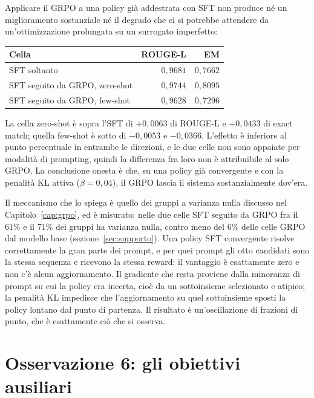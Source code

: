 Applicare il GRPO a una policy già addestrata con SFT non produce né un
miglioramento sostanziale né il degrado che ci si potrebbe attendere da
un'ottimizzazione prolungata su un surrogato imperfetto:

\begin{center}
\begin{tabular}{lrr}
\toprule
Cella & ROUGE-L & EM \\
\midrule
SFT soltanto & $0{,}9681$ & $0{,}7662$ \\
SFT seguito da GRPO, zero-shot & $0{,}9744$ & $0{,}8095$ \\
SFT seguito da GRPO, few-shot & $0{,}9628$ & $0{,}7296$ \\
\bottomrule
\end{tabular}
\end{center}

La cella zero-shot è sopra l'SFT di $+0{,}0063$ di ROUGE-L e $+0{,}0433$ di
exact match; quella few-shot è sotto di $-0{,}0053$ e $-0{,}0366$. L'effetto è
inferiore al punto percentuale in entrambe le direzioni, e le due celle non sono
appaiate per modalità di prompting, quindi la differenza fra loro non è
attribuibile al solo GRPO. La conclusione onesta è che, su una policy già
convergente e con la penalità KL attiva ($\beta = 0{,}04$), il GRPO lascia il
sistema sostanzialmente dov'era.

Il meccanismo che lo spiega è quello dei gruppi a varianza nulla discusso nel
Capitolo~\ref{cap:grpo}, ed è misurato: nelle due celle SFT seguito da GRPO fra
il $61\%$ e il $71\%$ dei gruppi ha varianza nulla, contro meno del $6\%$ delle
celle GRPO dal modello base (sezione~\ref{sec:supporto}). Una policy SFT
convergente risolve correttamente la gran parte dei prompt, e per quei prompt gli
otto candidati sono la stessa sequenza e ricevono la stessa reward: il vantaggio
è esattamente zero e non c'è alcun aggiornamento.
Il gradiente che resta proviene dalla minoranza di prompt su cui la policy era
incerta, cioè da un sottoinsieme selezionato e atipico; la penalità KL impedisce
che l'aggiornamento su quel sottoinsieme sposti la policy lontano dal punto di
partenza. Il risultato è un'oscillazione di frazioni di punto, che è esattamente
ciò che si osserva.

\section{Osservazione 6: gli obiettivi ausiliari}
\label{sec:osservazione-ausiliari}

